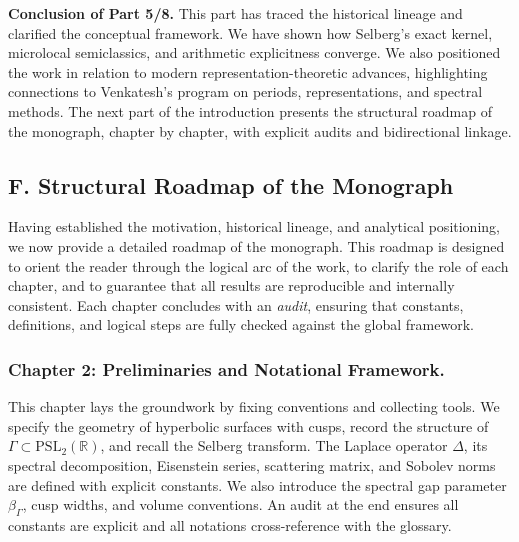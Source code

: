 \medskip

\noindent\textbf{Conclusion of Part 5/8.}
This part has traced the historical lineage and clarified the conceptual framework.
We have shown how Selberg’s exact kernel,
microlocal semiclassics, and arithmetic explicitness converge.
We also positioned the work in relation to modern representation-theoretic advances,
highlighting connections to Venkatesh’s program on periods, representations, and spectral methods.
The next part of the introduction presents the structural roadmap of the monograph,
chapter by chapter, with explicit audits and bidirectional linkage.


\subsection*{F. Structural Roadmap of the Monograph}

Having established the motivation, historical lineage, and analytical positioning,
we now provide a detailed roadmap of the monograph.
This roadmap is designed to orient the reader through the logical arc of the work,
to clarify the role of each chapter, and to guarantee
that all results are reproducible and internally consistent.
Each chapter concludes with an \emph{audit}, ensuring that constants, definitions,
and logical steps are fully checked against the global framework.

\subsubsection*{Chapter 2: Preliminaries and Notational Framework.}
This chapter lays the groundwork by fixing conventions and collecting tools.
We specify the geometry of hyperbolic surfaces with cusps,
record the structure of $\Gamma\subset \mathrm{PSL}_2(\mathbb{R})$,
and recall the Selberg transform.
The Laplace operator $\Delta$, its spectral decomposition,
Eisenstein series, scattering matrix, and Sobolev norms are defined with explicit constants.
We also introduce the spectral gap parameter $\beta_\Gamma$,
cusp widths, and volume conventions.
An audit at the end ensures all constants are explicit
and all notations cross-reference with the glossary.

